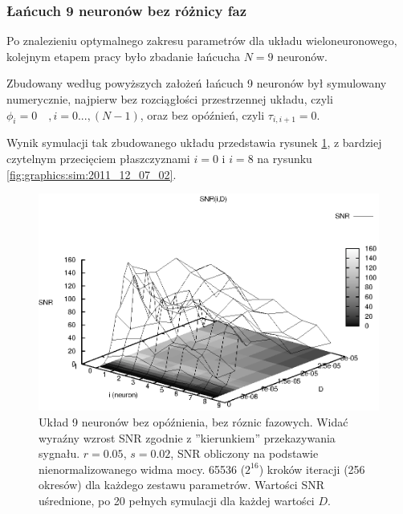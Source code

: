   \subsubsection{Łańcuch 9 neuronów bez różnicy faz}
  \label{sec:lancuch_9_bez_roznicy_faz}

  Po znalezieniu optymalnego zakresu parametrów dla układu wieloneuronowego, kolejnym etapem pracy było zbadanie łańcucha $N=9$ neuronów.

  Zbudowany według powyższych założeń łańcuch 9 neuronów był symulowany numerycznie, najpierw bez rozciągłości przestrzennej układu, czyli $\phi_i = 0 \quad, i=0...,(N-1) $, oraz bez opóźnień, czyli $\tau_{i,i+1}=0$.

  Wynik symulacji tak zbudowanego układu przedstawia rysunek \ref{fig:graphics:sim:2011_12_07_01}, z bardziej czytelnym przecięciem płaszczyznami $i=0$ i $i=8$ na rysunku \ref{fig:graphics:sim:2011_12_07_02}.

  \begin{figure}
    \includegraphics[width=140mm]{images/9neuron/2011_12_07_01}
    \caption{Układ 9 neuronów bez opóźnienia, bez róznic fazowych. Widać wyraźny wzrost SNR zgodnie z ''kierunkiem'' przekazywania sygnału. $r=0.05$, $s=0.02$, SNR obliczony na podstawie nienormalizowanego widma mocy. 65536 ($2^{16}$) kroków iteracji (256 okresów) dla każdego zestawu parametrów. Wartości SNR uśrednione, po 20 pełnych symulacji dla każdej wartości $D$.}
    \label{fig:graphics:sim:2011_12_07_01}
  \end{figure}

